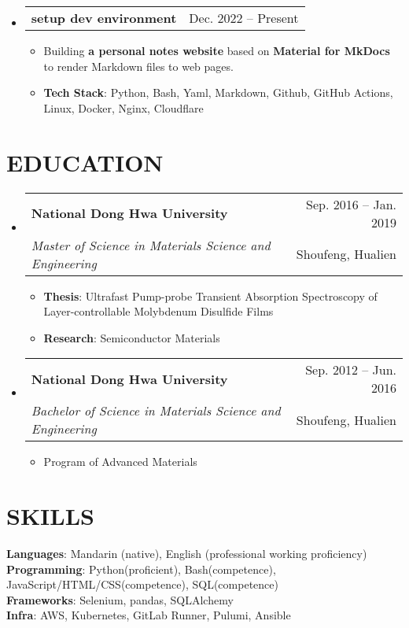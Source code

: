\documentclass[letterpaper,11pt]{article}
\makeatletter
\newcommand{\resumeItem}[1]{
  \item\small{
    {#1 \vspace{-1pt}}
  }
}
\newcommand{\resumeSubheading}[4]{
  \vspace{-1pt}\item
    \begin{tabular*}{\textwidth}[t]{l@{\extracolsep{\fill}}r}
      \textbf{#1} & {\color{dark-grey}\small #2}\vspace{1pt}\\ %
      \textit{#3} & {\color{dark-grey} \small #4}\\ %
    \end{tabular*}\vspace{-4pt}
}
\newcommand{\resumeProjectHeading}[2]{
    \item
    \begin{tabular*}{\textwidth}{l@{\extracolsep{\fill}}r}
      #1 & {\color{dark-grey} #2} \\  %
    \end{tabular*}\vspace{-4pt}
}
\newcommand{\resumeSubHeadingListStart}{\begin{itemize}[leftmargin=0in, label={}]}
\newcommand{\resumeSubHeadingListEnd}{\end{itemize}}
\newcommand{\resumeItemListStart}{\begin{itemize}}
\newcommand{\resumeItemListEnd}{\end{itemize}\vspace{0pt}}
\makeatother
\begin{document}
    \resumeSubHeadingListStart
    \resumeProjectHeading
        {\textbf{setup dev environment}} {Dec. 2022 -- Present}
        \resumeItemListStart
          \resumeItem{Building \textbf{a personal notes website} based on \textbf{Material for MkDocs} to render Markdown files to web pages.}
          \resumeItem{\textbf{Tech Stack}: Python, Bash, Yaml, Markdown, Github, GitHub Actions, Linux, Docker, Nginx, Cloudflare}
        \resumeItemListEnd          
    \resumeSubHeadingListEnd

\section {EDUCATION}
\resumeSubHeadingListStart
\resumeSubheading
  {National Dong Hwa University}{Sep. 2016 -- Jan. 2019}
  {Master of Science in Materials Science and Engineering}{Shoufeng, Hualien}
    \resumeItemListStart
  \resumeItem {\textbf{Thesis}: Ultrafast Pump-probe Transient Absorption Spectroscopy of Layer-controllable Molybdenum Disulfide Films}
    \resumeItem 
        {\textbf{Research}: Semiconductor Materials }
    \resumeItemListEnd
\resumeSubHeadingListEnd

\resumeSubHeadingListStart
\resumeSubheading
  {National Dong Hwa University}{Sep. 2012 -- Jun. 2016}
  {Bachelor of Science in Materials Science and Engineering}{Shoufeng, Hualien}
    \resumeItemListStart
    \resumeItem {Program of Advanced Materials}
    \resumeItemListEnd
\resumeSubHeadingListEnd

%
\section{SKILLS}
 \begin{itemize}[leftmargin=0in, label={}]
    \small{\item{
     \textbf{Languages}{: Mandarin (native), English (professional working proficiency)}\vspace{2pt} \\
     \textbf{Programming}{: Python(proficient), Bash(competence), JavaScript/HTML/CSS(competence), SQL(competence)}\vspace{2pt} \\
     \textbf{Frameworks}{: Selenium, pandas, SQLAlchemy} \\
     \textbf{Infra}{: AWS, Kubernetes, GitLab Runner, Pulumi, Ansible}
    }}
 \end{itemize}


\end{document}
